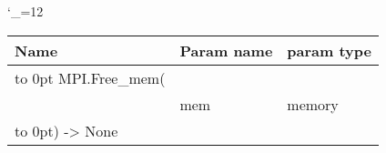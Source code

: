 \begingroup \catcode`\_=12 \tt
\begin{tabular}{lll}
\toprule
\textrm{Name}&\textrm{Param name}&\textrm{param type}\\
\midrule
\hbox to 0pt {MPI.Free_mem(\hss}\\
& mem & memory\\
\hbox to 0pt{) -> None\hss}\\
\bottomrule
\end{tabular}
\endgroup
